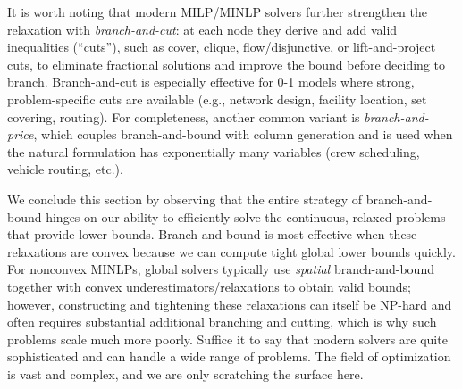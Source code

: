 \begin{exampleBox}
{    
    

    \begin{center}
    \end{center}
    }
\end{exampleBox}
    
It is worth noting that modern MILP/MINLP solvers further strengthen the relaxation with \emph{branch-and-cut}: at each node they derive and add valid inequalities (``cuts''), such as cover, clique, flow/disjunctive, or lift-and-project cuts, to eliminate fractional solutions and improve the bound before deciding to branch. Branch-and-cut is especially effective for 0-1 models where strong, problem-specific cuts are available (e.g., network design, facility location, set covering, routing). For completeness, another common variant is \emph{branch-and-price}, which couples branch-and-bound with column generation and is used when the natural formulation has exponentially many variables (crew scheduling, vehicle routing, etc.).

We conclude this section by observing that the entire strategy of branch-and-bound hinges on our ability to efficiently solve the continuous, relaxed problems that provide lower bounds. Branch-and-bound is most effective when these relaxations are convex because we can compute tight global lower bounds quickly. For nonconvex MINLPs, global solvers typically use \emph{spatial} branch-and-bound together with convex underestimators/relaxations to obtain valid bounds; however, constructing and tightening these relaxations can itself be NP-hard and often requires substantial additional branching and cutting, which is why such problems scale much more poorly. Suffice it to say that modern solvers are quite sophisticated and can handle a wide range of problems. The field of optimization is vast and complex, and we are only scratching the surface here.

